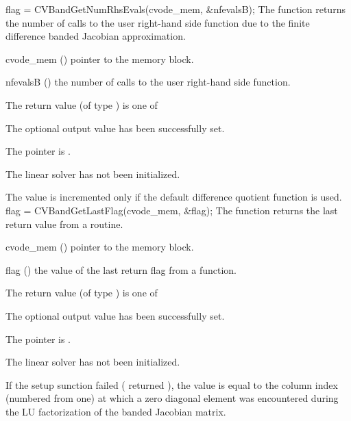 {}
{
  flag = CVBandGetNumRhsEvals(cvode\_mem, \&nfevalsB);
}
{
  The function  returns the
  number of calls to the user right-hand side function due to the 
  finite difference banded Jacobian approximation.
}
{
  \begin{args}
  \item[cvode\_mem] ()
    pointer to the {\cvode} memory block.
  \item[nfevalsB] ()
    the number of calls to the user right-hand side function.
  \end{args}
}
{
  The return value  (of type ) is one of
  \begin{args}
  \item[\Id{CVBAND\_SUCCESS}] 
    The optional output value has been successfully set.
  \item[\Id{CVBAND\_MEM\_NULL}]
    The  pointer is .
  \item[\Id{CVBAND\_LMEM\_NULL}]
    The {\cvband} linear solver has not been initialized.
  \end{args}
}
{
  The value  is incremented only if the default 
   difference quotient function is used.
}
{
  flag = CVBandGetLastFlag(cvode\_mem, \&flag);
}
{
  The function  returns the
  last return value from a {\cvband} routine. 
}
{
  \begin{args}
  \item[cvode\_mem] ()
    pointer to the {\cvode} memory block.
  \item[flag] ()
    the value of the last return flag from a {\cvband} function.
  \end{args}
}
{
  The return value  (of type ) is one of
  \begin{args}
  \item[\Id{CVBAND\_SUCCESS}] 
    The optional output value has been successfully set.
  \item[\Id{CVBAND\_MEM\_NULL}]
    The  pointer is .
  \item[\Id{CVBAND\_LMEM\_NULL}]
    The {\cvband} linear solver has not been initialized.
  \end{args}
}
{
  If the {\cvband} setup sunction failed ( returned ),
  the value  is equal to the column index (numbered from one) at which
  a zero diagonal element was encountered during the LU factorization of the 
  banded Jacobian matrix.
}
